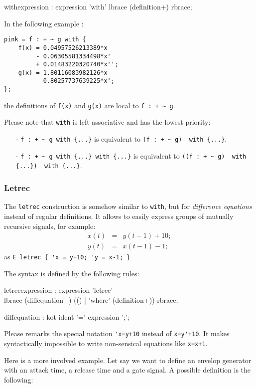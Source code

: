 \begin{rail}
withexpression : expression 'with' lbrace (definition+) rbrace;
\end{rail}


In the following example :
\begin{lstlisting}
pink = f : + ~ g with {
	f(x) = 0.04957526213389*x 
		 - 0.06305581334498*x' 
         + 0.01483220320740*x'';
	g(x) = 1.80116083982126*x 
		 - 0.80257737639225*x';
};
\end{lstlisting}
the definitions of \lstinline'f(x)' and \lstinline'g(x)' are local to \lstinline'f : + ~ g'.

Please note that \lstinline'with' is left associative and has the lowest priority:
\begin{itemize} 
\item[-] \lstinline'f : + ~ g with {...}' is equivalent to \lstinline'(f : + ~ g)  with {...}'. 
\item[-] \lstinline'f : + ~ g with {...} with {...}' is equivalent to \lstinline'((f : + ~ g)  with {...})  with {...}'. 
\end{itemize}

\subsubsection{Letrec} 
The \lstinline'letrec' construction is somehow similar to \lstinline'with', but for   \emph{difference equations} instead of regular definitions. It allows to easily express groups of mutually recursive signals, for example:
\begin{eqnarray*}
x(t)&=&y(t-1)+10;\\
y(t)&=&x(t-1)-1;
\end{eqnarray*}
as \lstinline|E letrec { 'x = y+10; 'y = x-1; }|	

The syntax is defined by the following rules:
\begin{rail}
	letrecexpression : expression 'letrec' \\ lbrace (diffequation+) (() | 'where' (definition+)) rbrace;
\end{rail}
\begin{rail}
	diffequation :    kot ident '=' expression ';';  
\end{rail}

Please remarks the special notation \lstinline|'x=y+10| instead of \lstinline|x=y'+10|. It makes syntactically impossible to write non-sensical equations like \lstinline|x=x+1|.

Here is a more involved example. Let say we want to define an envelop generator with an attack time, a release time and a gate signal. A possible definition is the following:

